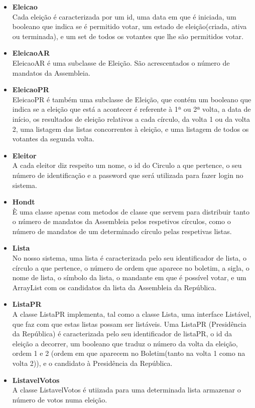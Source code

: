 \documentclass[a4paper,12pt]{report}
\begin{document}
\begin{itemize}
\item \textbf{Eleicao}
\\ Cada eleição é caracterizada por um id, uma data em que é iniciada, um booleano que indica se é permitido votar, um estado de eleição(criada, ativa ou terminada), e um set de todos os votantes que lhe são permitidos votar.
\item \textbf{EleicaoAR}
\\ EleicaoAR é uma subclasse de Eleição. São acrescentados o número de mandatos da Assembleia.
\item \textbf{EleicaoPR}
\\ EleicaoPR é também uma subclasse de Eleição, que contém um booleano que indica se a eleição que está a acontecer é referente à 1ª ou 2ª volta, a data de início, os resultados de eleição relativos a cada círculo, da volta 1 ou da volta 2, uma listagem das listas concorrentes à eleição, e uma listagem de todos os votantes da segunda volta.
\item \textbf{Eleitor}
\\ A cada eleitor diz respeito um nome, o id do Circulo a que pertence, o seu número de identificação e a password que será utilizada para fazer login no sistema.
\item \textbf{Hondt}
\\ È uma classe apenas com metodos de classe que servem para distribuir tanto o número de mandatos da Assembleia pelos respetivos círculos, como o número de mandatos de um determinado círculo pelas respetivas listas.
\item \textbf{Lista}
\\ No nosso sistema, uma lista é caracterizada pelo seu identificador de lista, o círculo a que pertence, o número de ordem que aparece no boletim, a sigla, o nome de lista, o símbolo da lista, o mandante em que é possível votar, e um ArrayList com os candidatos da lista da Assembleia da República.
\item \textbf{ListaPR}
\\ A classe ListaPR implementa, tal como a classe Lista, uma interface Listável, que faz com que estas listas possam ser listáveis. Uma ListaPR (Presidência da República) é caracterizada pelo seu identificador de listaPR, o id da eleição a decorrer, um booleano que traduz o número da volta da eleição, ordem 1 e 2 (ordem em que aparecem no Boletim(tanto na volta 1 como na volta 2)), e o candidato à Presidência da República.
\item \textbf{ListavelVotos}
\\ A classe ListavelVotos é utiizada para uma determinada lista armazenar o número de votos numa eleição.

\end{itemize}
\end{document}
